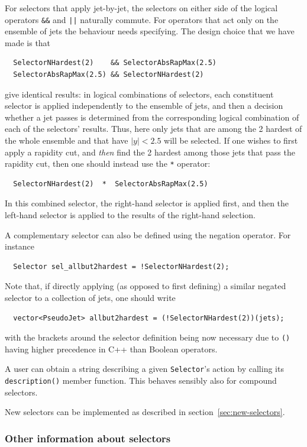 \documentclass[12pt,a4]{article}
\newcommand{\ttt}[1]{{\small\texttt{#1}}}
\begin{document}
For selectors that apply jet-by-jet, the selectors on either
side of the logical operators \ttt{\&\&} and \ttt{||} naturally
commute.
%
For operators that act only on the ensemble of jets the behaviour needs
specifying. 
%
The design choice that we have made is that
\begin{lstlisting}
  SelectorNHardest(2)    && SelectorAbsRapMax(2.5)
  SelectorAbsRapMax(2.5) && SelectorNHardest(2)
\end{lstlisting}
give identical results: in logical combinations of selectors, each
constituent selector is applied independently to the ensemble of jets,
and then a decision whether a jet passes is determined from the
corresponding logical combination of each of the selectors'
results. Thus, here only jets that are among the 2 hardest of the
whole ensemble and that have $|y|<2.5$ will be selected.
%
If one wishes to first apply a rapidity cut, and {\sl then} find the 2
hardest among those jets that pass the rapidity cut, then one should
instead use the \ttt{*} operator:
\begin{lstlisting}
  SelectorNHardest(2)  *  SelectorAbsRapMax(2.5)
\end{lstlisting}
In this combined selector, the right-hand selector is applied first,
and then the left-hand selector is applied to the results of the
right-hand selection.

A complementary selector can also be defined using the negation operator. For
instance
\begin{lstlisting}
  Selector sel_allbut2hardest = !SelectorNHardest(2);
\end{lstlisting}
Note that, if directly applying (as opposed to first defining) a similar 
negated selector to a collection
of jets, one should write
\begin{lstlisting}
  vector<PseudoJet> allbut2hardest = (!SelectorNHardest(2))(jets);
\end{lstlisting}
with the brackets around the selector definition being now necessary due to
\ttt{()} having higher precedence in C++ than Boolean operators.


A user can obtain a string describing a given \ttt{Selector}'s action by
calling its \ttt{description()} member function. 
%
This behaves sensibly also for compound selectors.

New selectors can be implemented as described in
section~\ref{sec:new-selectors}.


\subsubsection{Other information about selectors}
\end{document}
